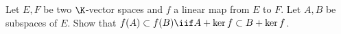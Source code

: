 Let $E, F$ be two $\K$-vector spaces and $f$ a linear map from $E$ to $F$. Let $A,B$ be subspaces of $E$.
Show that $f(A) \subset f(B) \iif A + \ker f \subset B + \ker f$.